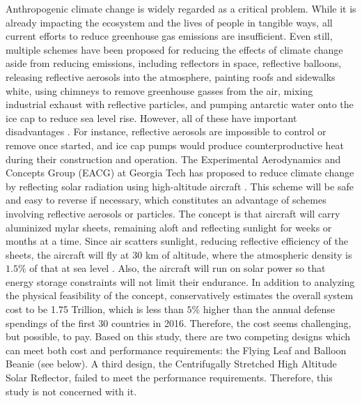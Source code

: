 \documentclass[12pt]{report} %
\begin{document}
Anthropogenic climate change is widely regarded as a critical problem. While it is already impacting the ecosystem and the
lives of people in tangible ways, all current efforts to reduce greenhouse gas emissions are insufficient. Even still, multiple schemes
have been proposed for reducing the effects of climate change aside from reducing emissions, including reflectors in space, reflective
balloons, releasing reflective aerosols into
the atmosphere, painting roofs and sidewalks white, using chimneys to remove greenhouse gasses from the air, mixing industrial exhaust with
reflective particles, and pumping antarctic water onto the ice cap to reduce sea level rise.
However, all of these have important
disadvantages \cite{us}. For instance, reflective aerosols are impossible to control or remove once started, and ice cap pumps would
produce counterproductive heat during their construction and operation. 
The Experimental Aerodynamics and Concepts Group (EACG) at Georgia Tech has proposed to reduce climate change by reflecting solar radiation
using high-altitude aircraft \cite{tradeoff}. This scheme will be safe and easy to reverse if necessary, which constitutes an advantage of
schemes involving reflective aerosols or particles. The concept is that aircraft will carry aluminized mylar sheets, remaining aloft and reflecting
sunlight for weeks or months at a time. Since air scatters sunlight, reducing reflective efficiency of the sheets, the aircraft will fly
at 30 km of altitude, where the atmospheric density is $1.5\%$ of that at sea level \cite{standardAtmosphere}. Also, the aircraft will run
on solar power so that energy storage constraints will not limit their endurance. In addition to analyzing the physical feasibility of the
concept, \cite{tradeoff} conservatively estimates the overall system cost to be 1.75 Trillion, which is less than $5\%$ higher than the annual
defense spendings of the first 30 countries in 2016. Therefore, the cost seems challenging, but possible, to pay. Based on this study, there
are two competing designs which can meet both cost and performance requirements: the Flying Leaf and Balloon Beanie (see below). A third design,
the Centrifugally Stretched High Altitude Solar Reflector, failed to meet the performance requirements. Therefore, this study is not concerned
with it.
\end{document}
